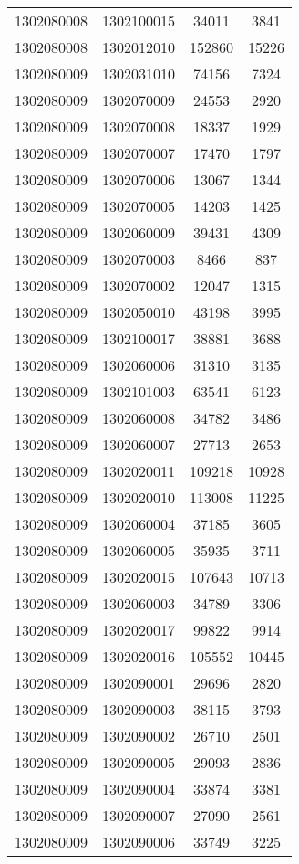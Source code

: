 \begin{longtable}[h]{llcc}
		1302080008 & 1302100015 & 34011 & 3841\\
		1302080008 & 1302012010 & 152860 & 15226\\
		1302080009 & 1302031010 & 74156 & 7324\\
		1302080009 & 1302070009 & 24553 & 2920\\
		1302080009 & 1302070008 & 18337 & 1929\\
		1302080009 & 1302070007 & 17470 & 1797\\
		1302080009 & 1302070006 & 13067 & 1344\\
		1302080009 & 1302070005 & 14203 & 1425\\
		1302080009 & 1302060009 & 39431 & 4309\\
		1302080009 & 1302070003 & 8466 & 837\\
		1302080009 & 1302070002 & 12047 & 1315\\
		1302080009 & 1302050010 & 43198 & 3995\\
		1302080009 & 1302100017 & 38881 & 3688\\
		1302080009 & 1302060006 & 31310 & 3135\\
		1302080009 & 1302101003 & 63541 & 6123\\
		1302080009 & 1302060008 & 34782 & 3486\\
		1302080009 & 1302060007 & 27713 & 2653\\
		1302080009 & 1302020011 & 109218 & 10928\\
		1302080009 & 1302020010 & 113008 & 11225\\
		1302080009 & 1302060004 & 37185 & 3605\\
		1302080009 & 1302060005 & 35935 & 3711\\
		1302080009 & 1302020015 & 107643 & 10713\\
		1302080009 & 1302060003 & 34789 & 3306\\
		1302080009 & 1302020017 & 99822 & 9914\\
		1302080009 & 1302020016 & 105552 & 10445\\
		1302080009 & 1302090001 & 29696 & 2820\\
		1302080009 & 1302090003 & 38115 & 3793\\
		1302080009 & 1302090002 & 26710 & 2501\\
		1302080009 & 1302090005 & 29093 & 2836\\
		1302080009 & 1302090004 & 33874 & 3381\\
		1302080009 & 1302090007 & 27090 & 2561\\
		1302080009 & 1302090006 & 33749 & 3225\\

\end{longtable}

